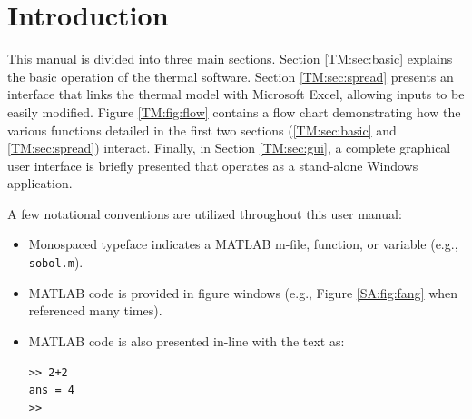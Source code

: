 \section{Introduction}
This manual is divided into three main sections.  Section \ref{TM:sec:basic} explains the basic operation of the thermal software.  Section \ref{TM:sec:spread} presents an interface that links the thermal model with Microsoft Excel, allowing inputs to be easily modified.  Figure \ref{TM:fig:flow} contains a flow chart demonstrating how the various functions detailed in the first two sections (\ref{TM:sec:basic} and \ref{TM:sec:spread}) interact. Finally, in Section \ref{TM:sec:gui}, a complete graphical user interface is briefly presented that operates as a stand-alone Windows application.

A few notational conventions are utilized throughout this user manual:
\begin{itemize}
\item Monospaced typeface indicates a MATLAB m-file, function, or variable (e.g., \texttt{sobol.m}).
\item MATLAB code is provided in figure windows (e.g., Figure \ref{SA:fig:fang} when referenced many times).
\item MATLAB code is also presented in-line with the text as:
\begin{singlespaced}\begin{lstlisting}[style=inline]
>> 2+2
ans = 4 
>>
\end{lstlisting}\end{singlespaced}\vspace*{0pt}
\end{itemize}

